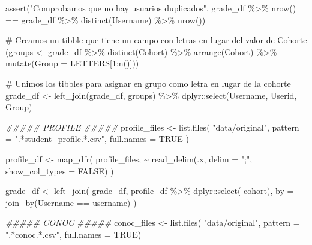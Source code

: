 \documentclass[
  12pt,
  a4paper,
  extrafontsizes,
  onecolumn,
  openright]{memoir}
\newenvironment{Shaded}{\begin{snugshade}}{\end{snugshade}}
\newcommand{\AttributeTok}[1]{\textcolor[rgb]{0.40,0.45,0.13}{#1}}
\newcommand{\CommentTok}[1]{\textcolor[rgb]{0.37,0.37,0.37}{#1}}
\newcommand{\ConstantTok}[1]{\textcolor[rgb]{0.56,0.35,0.01}{#1}}
\newcommand{\DecValTok}[1]{\textcolor[rgb]{0.68,0.00,0.00}{#1}}
\newcommand{\DocumentationTok}[1]{\textcolor[rgb]{0.37,0.37,0.37}{\textit{#1}}}
\newcommand{\FunctionTok}[1]{\textcolor[rgb]{0.28,0.35,0.67}{#1}}
\newcommand{\NormalTok}[1]{\textcolor[rgb]{0.00,0.23,0.31}{#1}}
\newcommand{\OtherTok}[1]{\textcolor[rgb]{0.00,0.23,0.31}{#1}}
\newcommand{\SpecialCharTok}[1]{\textcolor[rgb]{0.37,0.37,0.37}{#1}}
\newcommand{\StringTok}[1]{\textcolor[rgb]{0.13,0.47,0.30}{#1}}
\begin{document}
\begin{Shaded}
\begin{Highlighting}[]
\FunctionTok{assert}\NormalTok{(}\StringTok{"Comprobamos que no hay usuarios duplicados"}\NormalTok{, grade\_df }\SpecialCharTok{\%\textgreater{}\%} 
    \FunctionTok{nrow}\NormalTok{() }\SpecialCharTok{==}\NormalTok{ grade\_df }\SpecialCharTok{\%\textgreater{}\%}
    \FunctionTok{distinct}\NormalTok{(Username) }\SpecialCharTok{\%\textgreater{}\%}
    \FunctionTok{nrow}\NormalTok{())}

\CommentTok{\# Creamos un tibble que tiene un campo con letras en lugar del valor de Cohorte}
\NormalTok{(groups }\OtherTok{\textless{}{-}}\NormalTok{ grade\_df }\SpecialCharTok{\%\textgreater{}\%}
    \FunctionTok{distinct}\NormalTok{(Cohort) }\SpecialCharTok{\%\textgreater{}\%}
    \FunctionTok{arrange}\NormalTok{(Cohort) }\SpecialCharTok{\%\textgreater{}\%}
    \FunctionTok{mutate}\NormalTok{(}\AttributeTok{Group =}\NormalTok{ LETTERS[}\DecValTok{1}\SpecialCharTok{:}\FunctionTok{n}\NormalTok{()]))}

\CommentTok{\# Unimos los tibbles para asignar en grupo como letra en lugar de la cohorte}
\NormalTok{grade\_df }\OtherTok{\textless{}{-}} \FunctionTok{left\_join}\NormalTok{(grade\_df, groups) }\SpecialCharTok{\%\textgreater{}\%}\NormalTok{ dplyr}\SpecialCharTok{::}\FunctionTok{select}\NormalTok{(Username, Userid, Group)}

\DocumentationTok{\#\#\#\#\# PROFILE \#\#\#\#\#}
\NormalTok{profile\_files }\OtherTok{\textless{}{-}} \FunctionTok{list.files}\NormalTok{(}
    \StringTok{"data/original"}\NormalTok{, }\AttributeTok{pattern =} \StringTok{".*student\_profile.*.csv"}\NormalTok{, }\AttributeTok{full.names =} \ConstantTok{TRUE}
\NormalTok{)}

\NormalTok{profile\_df }\OtherTok{\textless{}{-}} \FunctionTok{map\_dfr}\NormalTok{(}
\NormalTok{    profile\_files, }\SpecialCharTok{\textasciitilde{}} \FunctionTok{read\_delim}\NormalTok{(.x, }\AttributeTok{delim =} \StringTok{";"}\NormalTok{, }\AttributeTok{show\_col\_types =} \ConstantTok{FALSE}\NormalTok{)}
\NormalTok{)}

\NormalTok{grade\_df }\OtherTok{\textless{}{-}} \FunctionTok{left\_join}\NormalTok{(}
\NormalTok{    grade\_df, profile\_df }\SpecialCharTok{\%\textgreater{}\%}\NormalTok{ dplyr}\SpecialCharTok{::}\FunctionTok{select}\NormalTok{(}\SpecialCharTok{{-}}\NormalTok{cohort), }\AttributeTok{by =} \FunctionTok{join\_by}\NormalTok{(Username }\SpecialCharTok{==}\NormalTok{ username)}
\NormalTok{)}


\DocumentationTok{\#\#\#\#\# CONOC \#\#\#\#\#}
\NormalTok{conoc\_files }\OtherTok{\textless{}{-}} \FunctionTok{list.files}\NormalTok{(}
    \StringTok{"data/original"}\NormalTok{, }\AttributeTok{pattern =} \StringTok{".*conoc.*.csv"}\NormalTok{, }\AttributeTok{full.names =} \ConstantTok{TRUE}\NormalTok{)}


\end{Highlighting}
\end{Shaded}
\end{document}
